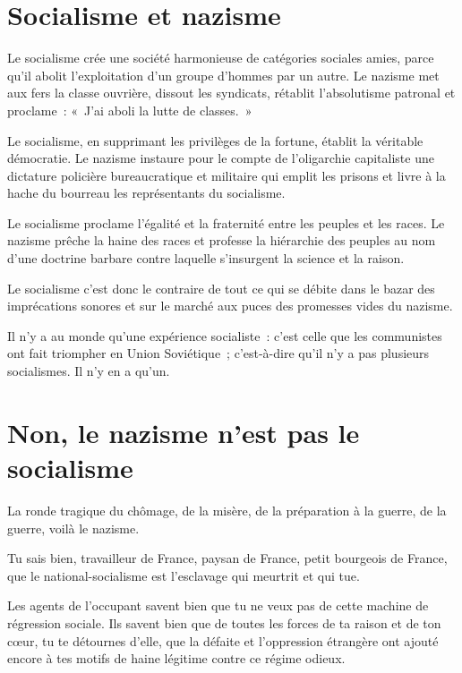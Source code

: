 \documentclass[french,twoside]{book} %
\begin{document}
\section[Socialisme et nazisme]{Socialisme et nazisme}
\noindent Le socialisme crée une société harmonieuse de catégories sociales amies, parce qu’il abolit l’exploitation d’un groupe d’hommes par un autre. Le nazisme met aux fers la classe ouvrière, dissout les syndicats, rétablit l’absolutisme patronal et proclame : « J’ai aboli la lutte de classes. »\par
Le socialisme, en supprimant les privilèges de la fortune, établit la véritable démocratie. Le nazisme instaure pour le compte de l’oligarchie capitaliste une dictature policière bureaucratique et militaire qui emplit les prisons et livre à la hache du bourreau les représentants du socialisme.\par
Le socialisme proclame l’égalité et la fraternité entre les peuples et les races. Le nazisme prêche la haine des races et professe la hiérarchie des peuples au nom d’une doctrine barbare contre laquelle s’insurgent la science et la raison.\par
Le socialisme c’est donc le contraire de tout ce qui se débite dans le bazar des imprécations sonores et sur le marché aux puces des promesses vides du nazisme.\par
Il n’y a au monde qu’une expérience socialiste : c’est celle que les communistes ont fait triompher en Union Soviétique ; c’est-à-dire qu’il n’y a pas plusieurs socialismes. Il n’y en a qu’un.
\section[Non, le nazisme n’est pas le socialisme]{Non, le nazisme n’est pas le socialisme}
\noindent La ronde tragique du chômage, de la misère, de la préparation à la guerre, de la guerre, voilà le nazisme.\par
Tu sais bien, travailleur de France, paysan de France, petit bourgeois de France, que le national-socialisme est l’esclavage qui meurtrit et qui tue.\par
Les agents de l’occupant savent bien que tu ne veux pas de cette machine de régression sociale. Ils savent bien que de toutes les forces de ta raison et de ton cœur, tu te détournes d’elle, que la défaite et l’oppression étrangère ont ajouté encore à tes motifs de haine légitime contre ce régime odieux.
\end{document}
